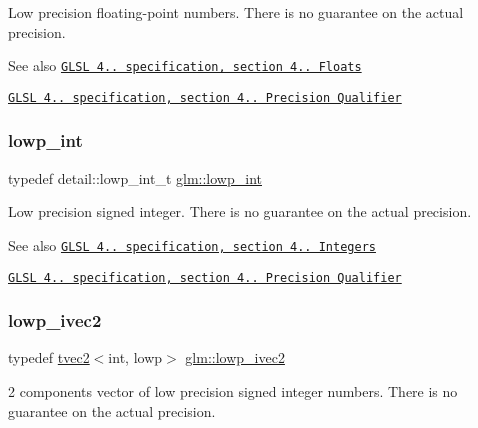 Low precision floating-\/point numbers. There is no guarantee on the actual precision.

\begin{DoxySeeAlso}{See also}
\href{http://www.opengl.org/registry/doc/GLSLangSpec.4.20.8.pdf}{\tt G\+L\+SL 4.. specification, section 4.. Floats} 

\href{http://www.opengl.org/registry/doc/GLSLangSpec.4.20.8.pdf}{\tt G\+L\+SL 4.. specification, section 4.. Precision Qualifier} 
\end{DoxySeeAlso}
\mbox{\label{group__core__precision_ga4681244bf4a184734f03aa9df4e3d288}} 
\subsubsection{\texorpdfstring{lowp\+\_\+int}{lowp\_int}}
{\footnotesize\ttfamily typedef detail\+::lowp\+\_\+int\+\_\+t \hyperlink{group__core__precision_ga4681244bf4a184734f03aa9df4e3d288}{glm\+::lowp\+\_\+int}}

Low precision signed integer. There is no guarantee on the actual precision.

\begin{DoxySeeAlso}{See also}
\href{http://www.opengl.org/registry/doc/GLSLangSpec.4.20.8.pdf}{\tt G\+L\+SL 4.. specification, section 4.. Integers} 

\href{http://www.opengl.org/registry/doc/GLSLangSpec.4.20.8.pdf}{\tt G\+L\+SL 4.. specification, section 4.. Precision Qualifier} 
\end{DoxySeeAlso}
\mbox{\label{group__core__precision_gafae8c6e9da91f4c6c1b85af5b8513097}} 
\subsubsection{\texorpdfstring{lowp\+\_\+ivec2}{lowp\_ivec2}}
{\footnotesize\ttfamily typedef \hyperlink{structglm_1_1tvec2}{tvec2}$<$int, lowp$>$ \hyperlink{group__core__precision_gafae8c6e9da91f4c6c1b85af5b8513097}{glm\+::lowp\+\_\+ivec2}}

2 components vector of low precision signed integer numbers. There is no guarantee on the actual precision.

